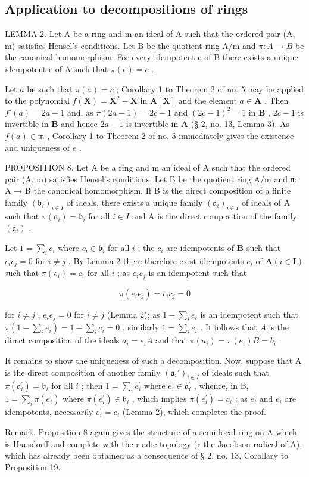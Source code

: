 \subsection{Application to decompositions of rings}

LEMMA 2. Let A be a ring and m an ideal of A such that the ordered pair (A, m) satisfies Hensel's conditions. Let B be the quotient ring A/m and \(\pi: A \to B\) be the canonical homomorphism. For every idempotent c of B there exists a unique idempotent e of A such that \(\pi(e) = c\) .

Let \(a\) be such that \(\pi(a) = c\) ; Corollary 1 to Theorem 2 of no. 5 may be applied to the polynomial \(f(\mathbf{X}) = \mathbf{X}^2 - \mathbf{X}\) in \(\mathbf{A}[\mathbf{X}]\) and the element \(a \in \mathbf{A}\) . Then \(f'(a) = 2a - 1\) and, as \(\pi(2a - 1) = 2c - 1\) and \((2c - 1)^2 = 1\) in \(\mathbf{B}\) , \(2c - 1\) is invertible in \(\mathbf{B}\) and hence \(2a - 1\) is invertible in \(\mathbf{A}\) (§ 2, no. 13, Lemma 3). As \(f(a) \in \mathfrak{m}\) , Corollary 1 to Theorem 2 of no. 5 immediately gives the existence and uniqueness of \(e\) .

PROPOSITION 8. Let A be a ring and m an ideal of A such that the ordered pair (A, m) satisfies Hensel's conditions. Let B be the quotient ring A/m and π: A → B the canonical homomorphism. If B is the direct composition of a finite family \((\mathfrak{b}_{i})_{i\in I}\) of ideals, there exists a unique family \((\mathfrak{a}_{i})_{i\in I}\) of ideals of A such that \(\pi(\mathfrak{a}_{i}) = \mathfrak{b}_{i}\) for all \(i \in I\) and A is the direct composition of the family \((\mathfrak{a}_{i})\) .

Let \(1 = \sum_{i} c_{i}\) where \(c_{i} \in \mathfrak{b}_{i}\) for all \(i\) ; the \(c_{i}\) are idempotents of \(\mathbf{B}\) such that \(c_{i}c_{j} = 0\) for \(i \neq j\) . By Lemma 2 there therefore exist idempotents \(e_{i}\) of \(\mathbf{A} (i \in \mathbf{I})\) such that \(\pi(e_{i}) = c_{i}\) for all \(i\) ; as \(e_{i}e_{j}\) is an idempotent such that

\[
\pi (e _ {i} e _ {j}) = c _ {i} c _ {j} = 0
\]

for \(i \neq j\) , \(e_i e_j = 0\) for \(i \neq j\) (Lemma 2); as \(1 - \sum_{i} e_i\) is an idempotent such that \(\pi\left(1 - \sum_{i} e_i\right) = 1 - \sum_{i} c_i = 0\) , similarly \(1 = \sum_{i} e_i\) . It follows that \(A\) is the direct composition of the ideals \(a_i = e_i A\) and that \(\pi(a_i) = \pi(e_i) B = b_i\) .

It remains to show the uniqueness of such a decomposition. Now, suppose that A is the direct composition of another family \((\mathfrak{a}_i')_{i\in I}\) of ideals such that \(\pi (\mathfrak{a}_i^{\prime}) = \mathfrak{b}_i\) for all \(i\) ; then \(1 = \sum_{i}e_{i}^{\prime}\) where \(e_i^\prime \in \mathfrak{a}_i^\prime\) , whence, in B, \(1 = \sum_{i}\pi (e_i^{\prime})\) where \(\pi (e_i^{\prime})\in \mathfrak{b}_i\) , which implies \(\pi (e_i^{\prime}) = c_i\) ; as \(e_i^\prime\) and \(e_i\) are idempotents, necessarily \(e_i^\prime = e_i\) (Lemma 2), which completes the proof.

Remark. Proposition 8 again gives the structure of a semi-local ring on A which is Hausdorff and complete with the r-adic topology (r the Jacobson radical of A), which has already been obtained as a consequence of § 2, no. 13, Corollary to Proposition 19.

